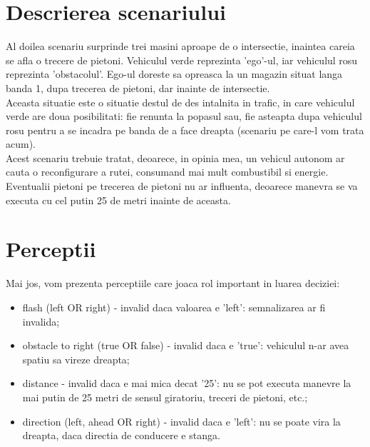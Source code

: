\documentclass[a4paper,12pt]{report}
\begin{document}
\section{Descrierea scenariului}
Al doilea scenariu surprinde trei masini aproape de o intersectie, inaintea careia se afla o trecere de pietoni. Vehiculul verde reprezinta 'ego'-ul, iar vehiculul rosu reprezinta 'obstacolul'. Ego-ul doreste sa opreasca la un magazin situat langa banda 1, dupa trecerea de pietoni, dar inainte de intersectie. \\
Aceasta situatie este o situatie destul de des intalnita in trafic, in care vehiculul verde are doua posibilitati: fie renunta la popasul sau, fie asteapta dupa vehiculul rosu pentru a se incadra pe banda de a face dreapta (scenariu pe care-l vom trata acum).\\
Acest scenariu trebuie tratat, deoarece, in opinia mea, un vehicul autonom ar cauta o reconfigurare a rutei, consumand mai mult combustibil si energie. Eventualii pietoni pe trecerea de pietoni nu ar influenta, deoarece manevra se va executa cu cel putin 25 de metri inainte de aceasta. \\

\section{Perceptii}
Mai jos, vom prezenta perceptiile care joaca rol important in luarea deciziei: \\
\begin{itemize}
    \item flash (left OR right) - invalid daca valoarea e 'left': semnalizarea ar fi invalida;
    \item obstacle to right (true OR false) - invalid daca e 'true': vehiculul n-ar avea spatiu sa vireze dreapta;
    \item distance - invalid daca e mai mica decat '25': nu se pot executa manevre la mai putin de 25 metri de sensul giratoriu, treceri de pietoni, etc.;
    \item direction (left, ahead OR right) - invalid daca e 'left': nu se poate vira la dreapta, daca directia de conducere e stanga.
\end{itemize}
\end{document}
